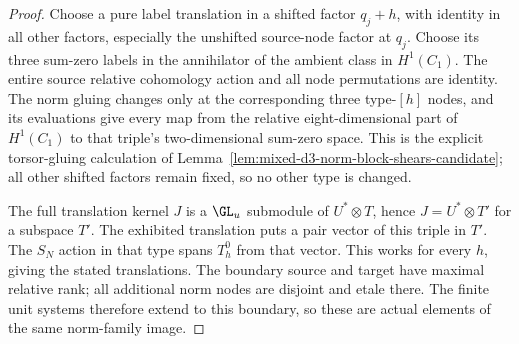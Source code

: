 \begin{proof}
Choose a pure label translation in a shifted factor $q_j+h$,
with identity in all other factors, especially the unshifted
source-node factor at $q_j$. Choose its three sum-zero labels
in the annihilator of the ambient class in $H^1(C_1)$.
The entire source relative cohomology action and all node
permutations are identity. The norm gluing changes only at
the corresponding three type-$[h]$ nodes, and its evaluations
give every map from the relative eight-dimensional part of
$H^1(C_1)$ to that triple's two-dimensional sum-zero space.
This is the explicit torsor-gluing calculation of
Lemma~\ref{lem:mixed-d3-norm-block-shears-candidate}; all other
shifted factors remain fixed, so no other type is changed.

The full translation kernel $J$ is a $\GL_u$ submodule of
$U^*\otimes T$, hence $J=U^*\otimes T'$ for a subspace $T'$.
The exhibited translation puts a pair vector of this triple
in $T'$. The $S_N$ action in that type spans $T_h^0$ from that
vector. This works for every $h$, giving the stated translations.
The boundary source and target have maximal relative rank;
all additional norm nodes are disjoint and etale there.
The finite unit systems therefore extend to this boundary, so
these are actual elements of the same norm-family image.
\end{proof}

